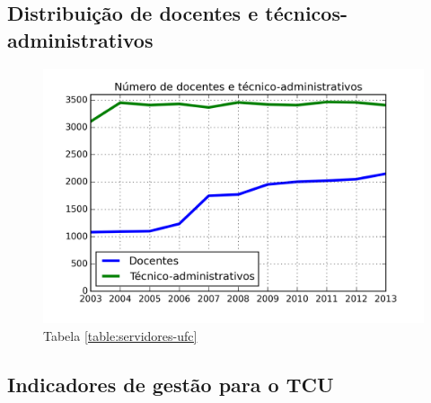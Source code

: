 \documentclass{report}
\begin{document}
\subsection{Distribuição de docentes e técnicos-administrativos}

\begin{figure}[H]
	\includegraphics{img/servidores_ufc.png}
	\caption{Tabela \ref{table:servidores-ufc}}
	\label{img:servidores-ufc}
\end{figure}

\subsection{Indicadores de gestão para o TCU}
\cite{indicadores_TCU}
\end{document}
